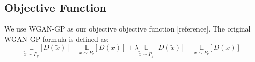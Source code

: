 \subsection{Objective Function}
We use WGAN-GP as our objective objective function [reference]. The original WGAN-GP formula is defined as:
\begin{equation}
\underset{\widetilde{x} \sim P_g}{\mathbb{E}}[D(\widetilde{x})] - \underset{x \sim P_r}{\mathbb{E}}[D(x)] + \lambda \underset{\tilde{x} \sim P_g}{\mathbb{E}}[D(\widetilde{x})] - \underset{x \sim P_r}{\mathbb{E}}[D(x)]
\end{equation}